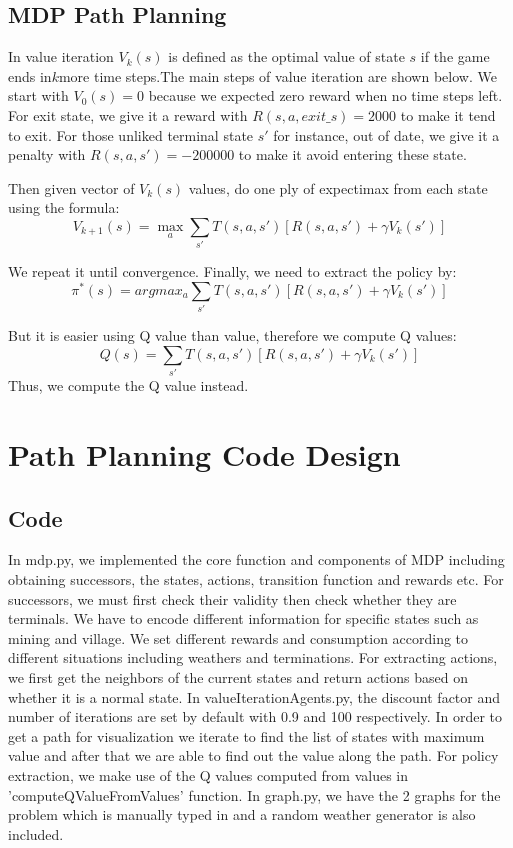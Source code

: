 \documentclass[10pt,twocolumn,letterpaper]{article}
\begin{document}
\subsection{MDP Path Planning}
In value iteration $V_k(s)$ is defined as the optimal value of state $s$ if the game ends in$ k $more time 
steps.The main steps of value iteration are shown below. We start with $V_0(s) = 0$ because we expected zero 
reward when no time steps left. For exit state, we give it a reward with $R(s,a,exit\_s) = 2000$ to make it tend to exit.
For those unliked terminal state $s'$ for instance, out of date, we give it a penalty with $R(s,a,s') = -200000$ to
make it avoid entering these state.

Then given vector of  $V_k(s)$ values, do one ply of expectimax from each state using 
the formula: $$V_{k+1}(s) = \max_a{\sum_{s'} T(s,a,s')[R(s,a,s')+\gamma V_k(s')] } $$

We repeat it until convergence. Finally, we need to extract the policy by:
$$\pi^* (s) = argmax_{a}\sum_{s'}T(s,a,s')[R(s,a,s')+\gamma V_k(s')]$$

But it is easier using Q value than value, therefore we compute Q values:
$$Q(s) = \sum_{s'}T(s,a,s')[R(s,a,s')+\gamma V_k(s')]$$
Thus, we compute the Q value instead.

\section{Path Planning Code Design}
\subsection{Code}
In mdp.py, we implemented the core function and components of MDP 
including obtaining successors, the states, actions, transition 
function and rewards etc. For successors, we must first check their 
validity then check whether they are terminals. We have to encode different 
information for specific states such as mining and village. We set different 
rewards and consumption according to different situations including weathers 
and terminations. For extracting actions, we first get the neighbors of the 
current states and return actions based on whether it is a normal state. 
In valueIterationAgents.py, the discount factor and number of iterations 
are set by default with 0.9 and 100 respectively. In order to get a path 
for visualization we iterate to find the list of states with maximum value 
and after that we are able to find out the value along the path. For policy 
extraction, we make use of the Q values computed from values in 
'computeQValueFromValues' function. In graph.py, we have the 
2 graphs for the problem which is manually typed in and a random weather 
generator is also included.
\end{document}

